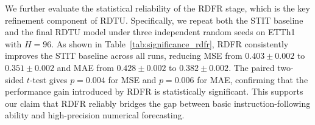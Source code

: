\begin{table}[htbp]
\centering
\caption{Statistical significance analysis of the RDFR stage on ETTh1 with $H=96$. We report mean and standard deviation over three independent runs. $p$-values are computed using a paired two-sided $t$-test between STIT and RDTU.}
\label{tab:significance_rdfr}
\centering
{}
\end{table}

We further evaluate the statistical reliability of the RDFR stage, which is the key refinement component of RDTU.
Specifically, we repeat both the STIT baseline and the final RDTU model under three independent random seeds on ETTh1 with $H=96$.
As shown in Table~\ref{tab:significance_rdfr}, RDFR consistently improves the STIT baseline across all runs, reducing MSE from $0.403 \pm 0.002$ to $0.351 \pm 0.002$ and MAE from $0.428 \pm 0.002$ to $0.382 \pm 0.002$.
The paired two-sided $t$-test gives $p=0.004$ for MSE and $p=0.006$ for MAE, confirming that the performance gain introduced by RDFR is statistically significant.
This supports our claim that RDFR reliably bridges the gap between basic instruction-following ability and high-precision numerical forecasting.
